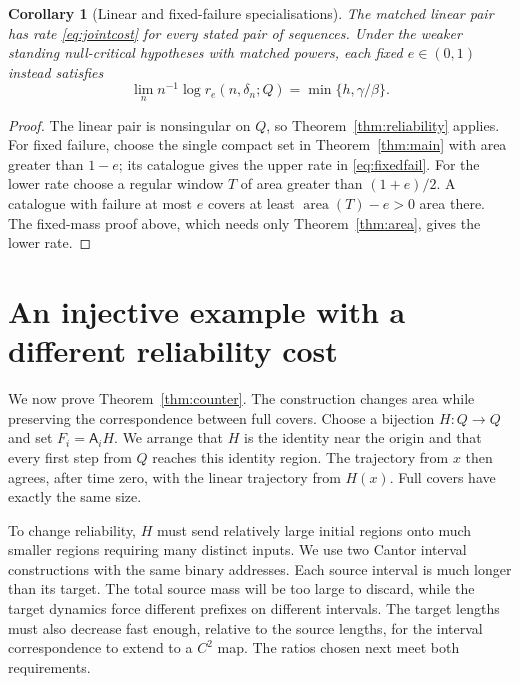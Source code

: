 \documentclass[11pt]{amsart}
\newtheorem{corollary}[theorem]{Corollary}
\theoremstyle{definition}
\theoremstyle{remark}
\newcommand{\area}{\operatorname{area}}
\numberwithin{equation}{section}
\begin{document}
\begin{corollary}[Linear and fixed-failure specialisations]\label{cor:failure}
The matched linear pair has rate \eqref{eq:jointcost} for every
stated pair of sequences. Under the weaker standing null-critical
hypotheses with matched powers, each fixed $e\in(0,1)$ instead satisfies
\begin{equation}\label{eq:fixedfail}
\lim_n n^{-1}\log r_e(n,\delta_n;Q)=\min\{h,\gamma/\beta\}.
\end{equation}
\end{corollary}
\begin{proof}
The linear pair is nonsingular on $Q$, so
Theorem~\ref{thm:reliability} applies.
For fixed failure, choose the single compact set in
Theorem~\ref{thm:main} with area greater than $1-e$; its catalogue
gives the upper rate in \eqref{eq:fixedfail}.
For the lower rate choose a regular window $T$ of area greater
than $(1+e)/2$. A catalogue with failure at most $e$ covers at
least $\area(T)-e>0$ area there. The fixed-mass proof above,
which needs only Theorem~\ref{thm:area}, gives the lower rate.
\end{proof}

\section{An injective example with a different reliability cost}
\label{sec:counter}
We now prove Theorem~\ref{thm:counter}. The construction changes
area while preserving the correspondence between full covers.
Choose a bijection $H:Q\to Q$ and set $F_i=\mathsf A_iH$.
We arrange that $H$ is the identity near the origin and that every
first step from $Q$ reaches this identity region. The trajectory
from $x$ then agrees, after time zero, with the linear trajectory
from $H(x)$. Full covers have exactly the same size.

To change reliability, $H$ must send relatively large initial
regions onto much smaller regions requiring many distinct inputs.
We use two Cantor interval constructions with the same binary
addresses. Each source interval is much longer than its target.
The total source mass will be too large to discard, while the
target dynamics force different prefixes on different intervals.
The target lengths must also decrease fast enough, relative to
the source lengths, for the interval correspondence to extend to
a $C^2$ map. The ratios chosen next meet both requirements.
\end{document}
